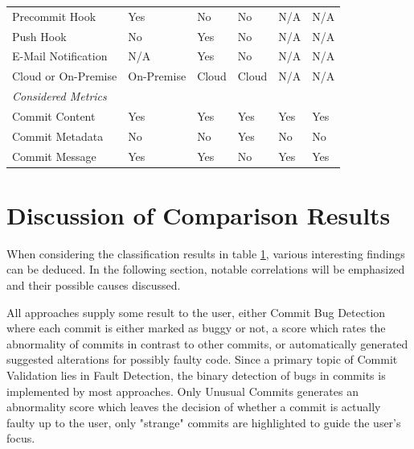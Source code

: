 \begin{table}[t]
\begin{tabular}{@{}llllll@{}}
		Precommit Hook                     & Yes        & No     & No      & N/A    & N/A   \\
		Push Hook                          & No         & Yes    & No      & N/A    & N/A   \\
		E-Mail Notification                & N/A        & Yes    & No      & N/A    & N/A   \\
		Cloud or On-Premise                & On-Premise & Cloud  & Cloud   & N/A    & N/A   \\ \midrule
		\textit{Considered Metrics}        &            &        &         &        &       \\ 
		Commit Content                     & Yes        & Yes    & Yes     & Yes    & Yes   \\
		Commit Metadata                    & No         & No     & Yes     & No     & No    \\
		Commit Message                     & Yes        & Yes    & No      & Yes    & Yes   \\ \bottomrule
	\end{tabular}
	\label{tab:classification}
\end{table}

\section{Discussion of Comparison Results}
\label{sec:discussion}

When considering the classification results in table \ref{tab:classification}, various interesting findings can be deduced. In the following section, notable correlations will be emphasized and their possible causes discussed.

All approaches supply some result to the user, either Commit Bug Detection where each commit is either marked as buggy or not, a score which rates the abnormality of commits in contrast to other commits, or automatically generated suggested alterations for possibly faulty code. Since a primary topic of Commit Validation lies in Fault Detection, the binary detection of bugs in commits is implemented by most approaches. Only Unusual Commits \cite{Goyal2017} generates an abnormality score which leaves the decision of whether a commit is actually faulty up to the user, only "strange" commits are highlighted to guide the user's focus.

